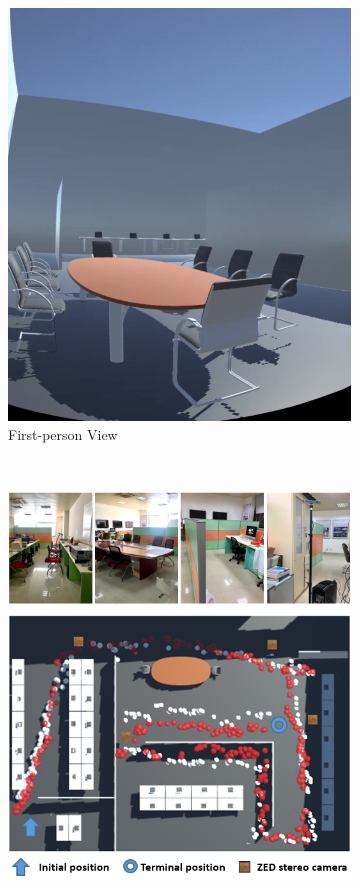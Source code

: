 \documentclass[review]{vgtc}                 %
\begin{document}
\begin{figure}[!htpb]
\begin{subfigure}{0.44\linewidth}
		\includegraphics[width=\linewidth]{./figs/lab_virtual.png}
		\caption[]{\label{fig:lab_virtual} First-person View
		}
	\end{subfigure}	
	~
	\\
	\begin{subfigure}{\linewidth}
		\centering	
		\includegraphics[width=0.90\linewidth]{./figs/lab_comparison.png}

\end{subfigure}
\end{figure}
\end{document}
